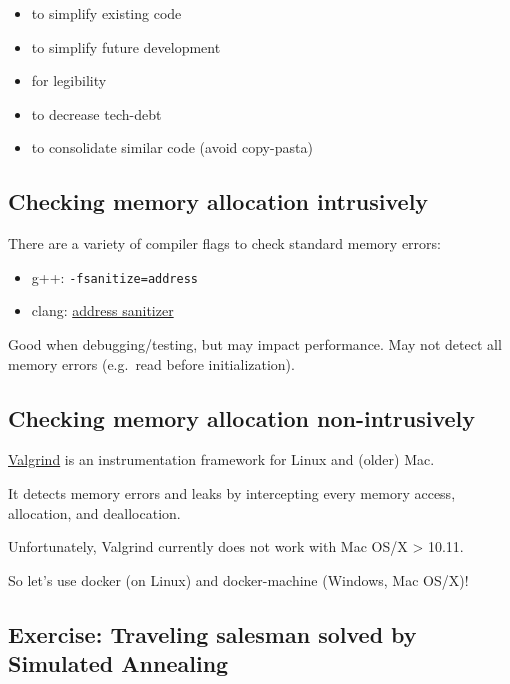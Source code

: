 \begin{itemize}
\itemsep1pt\parskip0pt
\item
  to simplify existing code
\item
  to simplify future development
\item
  for legibility
\item
  to decrease tech-debt
\item
  to consolidate similar code (avoid copy-pasta)
\end{itemize}

\subsection{Checking memory allocation
intrusively}\label{checking-memory-allocation-intrusively}

There are a variety of compiler flags to check standard memory errors:

\begin{itemize}
\itemsep1pt\parskip0pt
\item
  g++: \texttt{-fsanitize=address}
\item
  clang:
  \href{https://clang.llvm.org/docs/AddressSanitizer.html}{address
  sanitizer}
\end{itemize}

Good when debugging/testing, but may impact performance. May not detect
all memory errors (e.g.~read before initialization).

\subsection{Checking memory allocation
non-intrusively}\label{checking-memory-allocation-non-intrusively}

\href{http://valgrind.org/}{Valgrind} is an instrumentation framework
for Linux and (older) Mac.

It detects memory errors and leaks by intercepting every memory access,
allocation, and deallocation.

Unfortunately, Valgrind currently does not work with Mac OS/X
\textgreater{} 10.11.

So let's use docker (on Linux) and docker-machine (Windows, Mac OS/X)!

\subsection{Exercise: Traveling salesman solved by Simulated
Annealing}\label{exercise-traveling-salesman-solved-by-simulated-annealing}

